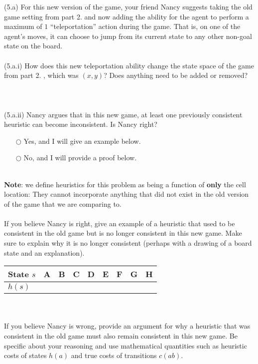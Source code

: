 \documentclass{article}
\begin{document}
\noindent (5.a) For this new version of the game, your friend Nancy suggests taking the old game setting from part 2. and now adding the ability for the agent to perform a maximum of $1$ ``teleportation'' action during the game. That is, on one of the agent's moves, it can choose to jump from its current state to any other non-goal state on the board.\\
~\\
(5.a.i) How does this new teleportation ability change the state space of the game from part 2. , which was $(x, y)$? Does anything need to be added or removed?\\
~\\
~\\
~\\
(5.a.ii) Nancy argues that in this new game, at least one previously consistent heuristic can become inconsistent. Is Nancy right? 
\begin{itemize}
\item[$\bigcirc$] Yes, and I will give an example below.
\item[$\bigcirc$] No, and I will provide a proof below. 
\end{itemize}
~\\
\textbf{Note}: we define heuristics for this problem as being a function of \textbf{only} the cell location: They cannot incorporate anything that did not exist in the old version of the game that we are comparing to.\\
~\\
If you believe Nancy is right, give an example of a heuristic that used to be consistent in the old game but is no longer consistent in this new game. Make sure to explain why it is no longer consistent (perhaps with a drawing of a board state and an explanation).
\renewcommand\arraystretch{1.5}
\begin{table}[tbh!]
\begin{center}
    \begin{tabular}{|p{2cm}| p{1cm}| p{1cm} | p{1cm}| p{1cm} | p{1cm}| p{1cm} | p{1cm}| p{1cm}|}
\hline
    State $s$  & A & B & C & D & E & F & G & H \\ \hline
    $h(s)$ &   &   &   &  &   &   &   &  \\
\hline
\end{tabular}
\end{center}
\end{table}
~\\
~\\
If you believe Nancy is wrong, provide an argument for why a heuristic that was consistent in the old game must also remain consistent in this new game. Be specific about your reasoning and use mathematical quantities such as heuristic costs of states $h(a)$ and true costs of transitions $c(ab)$.\\
\end{document}
